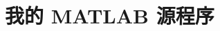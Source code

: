 \documentclass[bwprint]{gmcmthesis}
\begin{document}




\cite{mittelbach_latex_2004,wright_latex3_2009,beeton_unicode_2008,vieth_experiences_2009}


\newpage
\appendix
\section{我的 MATLAB 源程序}

\end{document}
